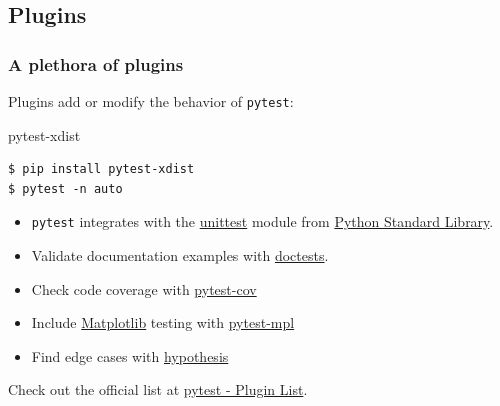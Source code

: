 \documentclass[t]{beamer}
\begin{document}
\subsection{Plugins}
\begin{frame}[fragile=singleslide]
  \frametitle{A plethora of plugins}

   Plugins add or modify the behavior of \texttt{pytest}:

   \begin{exampleblock}{\small pytest-xdist}
     \vspace{-5pt}
     \begin{lstlisting}[basicstyle=\ttfamily\scriptsize]
$ pip install pytest-xdist
$ pytest -n auto
     \end{lstlisting}
     \vspace{-5pt}
   \end{exampleblock}

   \vspace{-3pt}

   \begin{itemize}
   \item \texttt{pytest} integrates with the
     \href{https://docs.python.org/3/library/unittest.html}{unittest} module
     from \href{https://docs.python.org/3/library/}{Python Standard Library}.
   \item Validate documentation examples with \href{https://docs.python.org/3/library/doctest.html}{doctests}.
   \item Check code coverage with \href{https://pypi.org/project/pytest-cov/}{pytest-cov}
   \item Include \href{https://matplotlib.org/}{Matplotlib} testing with \href{https://pypi.org/project/pytest-mpl/}{pytest-mpl}
   \item Find edge cases with \href{https://pypi.org/project/hypothesis/}{hypothesis}
   \end{itemize}

   \vspace{0.2em}

   Check out the official list at \href{https://docs.pytest.org/en/latest/reference/plugin\_list.html}{pytest - Plugin List}.

\end{frame}

\end{document}

